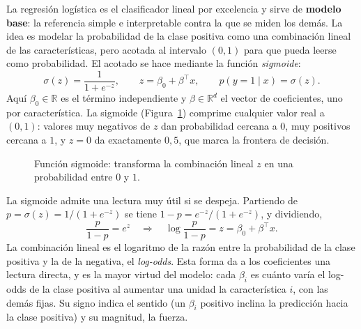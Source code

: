\documentclass[12pt,a4paper]{report}
\theoremstyle{definition}
\begin{document}
\medskip
La regresión logística \cite{cox1958logreg} es el clasificador lineal por excelencia y sirve de
\textbf{modelo base}: la referencia simple e interpretable contra la que se miden los demás. La idea es modelar la probabilidad de la clase
positiva como una combinación lineal de las características, pero acotada al intervalo $(0,1)$ para que
pueda leerse como probabilidad. El acotado se hace mediante la función \emph{sigmoide}:
\begin{equation}
\sigma(z)=\frac{1}{1+e^{-z}},\qquad z = \beta_0 + \beta^{\top}x,\qquad p(y=1\mid x)=\sigma(z).
\label{eq:sigmoide}
\end{equation}
Aquí $\beta_0\in\mathbb{R}$ es el término independiente y $\beta\in\mathbb{R}^d$ el vector de
coeficientes, uno por característica. La sigmoide (Figura~\ref{fig:sigmoide}) comprime cualquier valor
real a $(0,1)$: valores muy negativos de $z$ dan probabilidad cercana a $0$, muy positivos cercana a
$1$, y $z=0$ da exactamente $0{,}5$, que marca la frontera de decisión.

\begin{figure}[H]
\centering
{}
\caption{Función sigmoide: transforma la combinación lineal $z$ en una probabilidad entre $0$ y $1$.}
\label{fig:sigmoide}
\end{figure}

La sigmoide admite una lectura muy útil si se despeja. Partiendo de $p=\sigma(z)=1/(1+e^{-z})$ se tiene
$1-p = e^{-z}/(1+e^{-z})$, y dividiendo,
\begin{equation}
\frac{p}{1-p} = e^{z}\quad\Longrightarrow\quad \log\frac{p}{1-p} = z = \beta_0 + \beta^{\top}x.
\label{eq:logodds}
\end{equation}
La combinación lineal es el logaritmo de la razón entre la probabilidad de la clase positiva y la de la
negativa, el \emph{log-odds}. Esta forma da a los coeficientes una lectura directa, y es la mayor
virtud del modelo: cada $\beta_i$ es cuánto varía el log-odds de la clase positiva al aumentar una
unidad la característica $i$, con las demás fijas. Su signo indica el sentido (un $\beta_i$ positivo
inclina la predicción hacia la clase positiva) y su magnitud, la fuerza.
\end{document}
